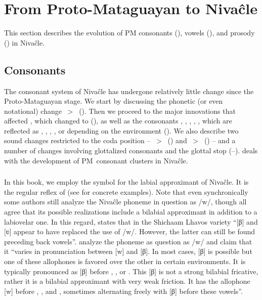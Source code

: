 \section{From Proto-Mataguayan to Nivaĉle}\label{pm-to-ni}

This section describes the evolution of PM consonants (), vowels (), and prosody () in Nivaĉle.

\subsection{Consonants}\label{ni-consonants}

The consonant system of Nivaĉle has undergone relatively little change since the Proto-Mataguayan stage. We start by discussing the phonetic (or even notational) change ~>~ (). Then we proceed to the major innovations that affected , which changed to  (), as well as the consonants , , , , , which are reflected as , , , , or  depending on the environment (). We also describe two sound changes restricted to the coda position -- ~>~ () and ~>~ () -- and a number of changes involving glottalized consonants and the glottal stop (--).  deals with the development of PM~consonant clusters in Nivaĉle.

\subsubsection{}\label{ni-v}

In this book, we employ the symbol  for the labial approximant of Nivaĉle. It is the regular reflex of  (see  for concrete examples). Note that even synchronically some authors still analyze the Nivaĉle phoneme in question as /w/, though all agree that its possible realizations include a bilabial approximant in addition to a labiovelar one. In this regard, \citet[4]{AnG16} states that in the Shichaam Lhavos variety ``[β] and [ʋ] appear to have replaced the use of /w/. However, the latter can still be found preceding back vowels''. \citet[44–45]{LC20} analyze the phoneme as question as /w/ and claim that it ``varies in pronunciation between [w] and [β]. In most cases, [β] is possible but one of these allophones is favored over the other in certain environments. It is typically pronounced as [β] before , , or . This [β] is not a strong bilabial fricative, rather it is a bilabial approximant with very weak friction. It has the allophone [w] before , , and  , sometimes alternating freely with [β] before these vowels''.

